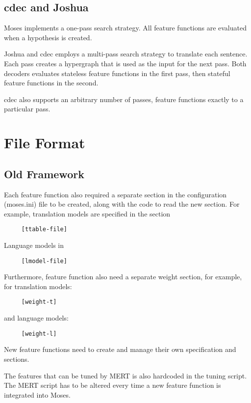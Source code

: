 \documentclass{pbml}
\begin{document}
\subsection{cdec and Joshua}
Moses implements a one-pass search strategy. All feature functions are evaluated when a hypothesis is created.

Joshua and cdec employs a multi-pass search strategy to translate each sentence. Each pass creates a hypergraph that is used as the input for the next pass. Both decoders evaluates stateless feature functions in the first pass, then stateful feature functions in the second.

cdec also supports an arbitrary number of passes, feature functions exactly to a particular pass.

\section{File Format}
\subsection{Old Framework}
Each feature function also required a separate section in the configuration (moses.ini) file to be created, along with the code to read the new section. For example, translation models are specified in the section
\begin{verbatim}
     [ttable-file]
\end{verbatim}
Language models in
\begin{verbatim}
     [lmodel-file]
\end{verbatim}
Furthermore, feature function also need a separate weight section, for example, for translation models:
\begin{verbatim}
     [weight-t]
\end{verbatim}
and language models:
\begin{verbatim}
     [weight-l]
\end{verbatim}
New feature functions need to create and manage their own specification and sections.

The features that can be tuned by MERT is also hardcoded in the tuning script. The MERT script has to be altered every time a new feature function is integrated into Moses.
\end{document}

